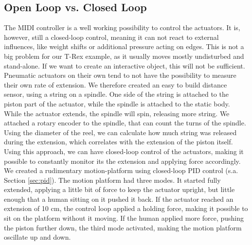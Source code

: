 \subsection{Open Loop vs. Closed Loop}
The MIDI controller is a well working possibility to control the actuators. It is, however, still a closed-loop control, meaning it can not react to external influences, like weight shifts or additional pressure acting on edges. This is not a big problem for our T-Rex example, as it usually moves mostly undisturbed and stand-alone. If we want to create an interactive object, this will not be sufficient.\\
Pneumatic actuators on their own tend to not have the possibility to measure their own rate of extension. We therefore created an easy to build distance sensor, using a string on a spindle. One side of the string is attached to the piston part of the actuator, while the spindle is attached to the static body. While the actuator extends, the spindle will spin, releasing more string. We attached a rotary encoder to the spindle, that can count the turns of the spindle. Using the diameter of the reel, we can calculate how much string was released during the extension, which correlates with the extension of the piston itself.\\
Using this approach, we can have closed-loop control of the actuators, making it possible to constantly monitor its the extension and applying force accordingly.\\
We created a rudimentary motion-platform using closed-loop PID control (s.a. Section \ref{sec:pid}). The motion platform had three modes. It started fully extended, applying a little bit of force to keep the actuator upright, but little enough that a human sitting on it pushed it back. If the actuator reached an extension of 10 cm, the control loop applied a holding force, making it possible to sit on the platform without it moving. If the human applied more force, pushing the piston further down, the third mode activated, making the motion platform oscillate up and down.
